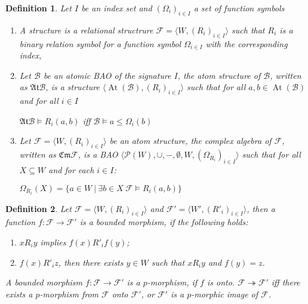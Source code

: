 \documentclass[a4paper]{article}
\theoremstyle{defin}
\newtheorem{defin}{Definition}
\theoremstyle{theorem}
\theoremstyle{claim}
\theoremstyle{prop}
\theoremstyle{lemma}
\theoremstyle{fact}
\theoremstyle{ex}
\theoremstyle{col}
\begin{document}
\begin{defin}  Let $I$ be an index set and $(\Omega_i)_{i \in I}$ a set of function symbols
\begin{enumerate}
  \item A structure is a relational structrure
  $\mathcal{F} = \langle W, (R_{i})_{i \in I} \rangle$
  such that $R_{i}$ is a binary relation symbol for a function symbol $\Omega_{i \in I}$ with the corresponding index,
  \item Let $\mathcal{B}$ be an atomic BAO of the signature $I$,
the atom structure of $\mathcal{B}$, written as $\mathfrak{At} \mathcal{B}$, is a structure $\langle \operatorname{At}(\mathcal{B}), (R_{i})_{i \in I} \rangle$ such that for all
$a, b \in \operatorname{At}(\mathcal{B})$ and for all $i \in I$
\begin{center}
  $\mathfrak{At} \mathcal{B} \models R_{i}(a,b)$ iff $\mathcal{B} \models a \leq \Omega_{i}(b)$
\end{center}
\item Let $\mathcal{F} = \langle W, (R_{i})_{i \in I} \rangle$ be an atom structure, the complex algebra of $\mathcal{F}$, written as $\mathfrak{Cm} \mathcal{F}$, is a BAO
$\langle \mathcal{P}(W), \cup, -, \emptyset, W, (\Omega_{R_{i}})_{i \in I} \rangle$ such that
for all $X \subseteq W$ and for each $i \in I$:
\begin{center}
  $\Omega_{R_{i}}(X) = \{ a \in W \: | \: \exists b \in X \: \mathcal{F} \models R_{i}(a, b)\}$
\end{center}
\end{enumerate}
\end{defin}

\begin{defin} Let $\mathcal{F} = \langle W, (R_{i})_{i \in I} \rangle$ and $\mathcal{F}' = \langle W', ({R'}_{i})_{i \in I} \rangle$, then a function $f : \mathcal{F} \to \mathcal{F}'$ is a bounded morphism, if the following holds:
\begin{enumerate}
\item $x R_i y$ implies $f(x) {R'}_i f(y)$;
\item $f(x) {R'}_i z$, then there exists $y \in W$ such that $x R_i y$ and $f(y) = z$.
\end{enumerate}
A bounded morphism $f : \mathcal{F} \to \mathcal{F}'$ is a $p$-morphism, if $f$ is onto. $\mathcal{F} \twoheadrightarrow \mathcal{F}'$ iff there exists a $p$-morphism from $\mathcal{F}$ onto $\mathcal{F}'$, or $\mathcal{F}'$ is a $p$-morphic image of $\mathcal{F}$.
\end{defin}
\end{document}
